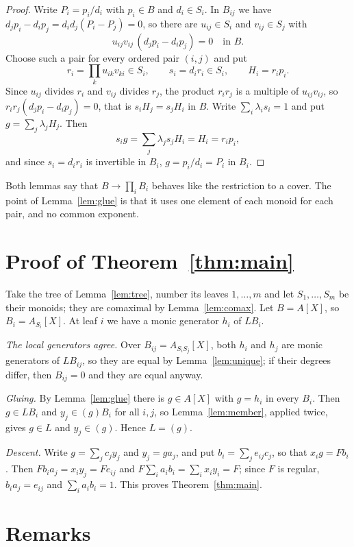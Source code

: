 \documentclass[11pt]{amsart}
\theoremstyle{remark}
\begin{document}
\begin{proof}
Write $P_i=p_i/d_i$ with $p_i\in B$ and $d_i\in S_i$. In $B_{ij}$ we have
$d_jp_i-d_ip_j=d_id_j(P_i-P_j)=0$, so there are $u_{ij}\in S_i$ and
$v_{ij}\in S_j$ with
\[
u_{ij}v_{ij}\,(d_jp_i-d_ip_j)=0\quad\text{in }B.
\]
Choose such a pair for every ordered pair $(i,j)$ and put
\[
r_i=\textstyle\prod_k u_{ik}v_{ki}\in S_i,\qquad s_i=d_ir_i\in S_i,\qquad H_i=r_ip_i .
\]
Since $u_{ij}$ divides $r_i$ and $v_{ij}$ divides $r_j$, the product $r_ir_j$ is
a multiple of $u_{ij}v_{ij}$, so $r_ir_j(d_jp_i-d_ip_j)=0$, that is
$s_iH_j=s_jH_i$ in $B$. Write $\sum_i\lambda_is_i=1$ and put
$g=\sum_j\lambda_jH_j$. Then
\[
s_ig=\textstyle\sum_j\lambda_js_jH_i=H_i=r_ip_i,
\]
and since $s_i=d_ir_i$ is invertible in $B_i$, $g=p_i/d_i=P_i$ in $B_i$.
\end{proof}

Both lemmas say that $B\to\prod_iB_i$ behaves like the restriction to a cover.
The point of Lemma~\ref{lem:glue} is that it uses one element of each monoid
for each pair, and no common exponent.

\section{Proof of Theorem~\ref{thm:main}}

Take the tree of Lemma~\ref{lem:tree}, number its leaves $1,\dots,m$ and let
$S_1,\dots,S_m$ be their monoids; they are comaximal by Lemma~\ref{lem:comax}.
Let $B=A[X]$, so $B_i=A_{S_i}[X]$. At leaf $i$ we have a monic generator $h_i$
of $LB_i$.

\emph{The local generators agree.} Over $B_{ij}=A_{S_iS_j}[X]$, both $h_i$ and
$h_j$ are monic generators of $LB_{ij}$, so they are equal by
Lemma~\ref{lem:unique}; if their degrees differ, then $B_{ij}=0$ and they are
equal anyway.

\emph{Gluing.} By Lemma~\ref{lem:glue} there is $g\in A[X]$ with $g=h_i$ in
every $B_i$. Then $g\in LB_i$ and $y_j\in(g)B_i$ for all $i,j$, so
Lemma~\ref{lem:member}, applied twice, gives $g\in L$ and $y_j\in(g)$. Hence
$L=(g)$.

\emph{Descent.} Write $g=\sum_jc_jy_j$ and $y_j=ga_j$, and put
$b_i=\sum_je_{ij}c_j$, so that $x_ig=Fb_i$. Then $Fb_ia_j=x_iy_j=Fe_{ij}$ and
$F\sum_ia_ib_i=\sum_ix_iy_i=F$; since $F$ is regular, $b_ia_j=e_{ij}$ and
$\sum_ia_ib_i=1$. This proves Theorem~\ref{thm:main}.

\section{Remarks}
\end{document}
